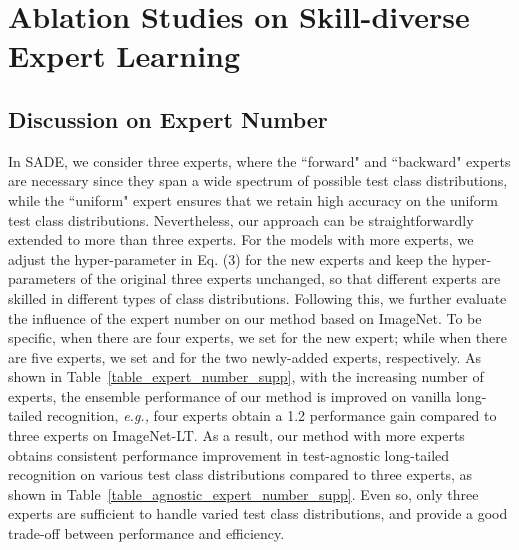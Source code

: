 \documentclass{article}
\def\eg{\emph{e.g.}} \def\Eg{\emph{E.g.}}
\def\eg{\emph{e.g., }}
\begin{document}
\clearpage 
\section{Ablation Studies on Skill-diverse Expert Learning}\label{App_E}
\subsection{Discussion on Expert Number}\label{App_E1}
In SADE, we consider three experts, where the ``forward" and ``backward" experts are necessary since they span a wide spectrum of possible test class distributions, while the ``uniform" expert ensures that we retain high accuracy on the uniform test class distributions. 
Nevertheless, our approach can be straightforwardly extended to more than three experts. 
For the models with  more  experts, we   adjust the  hyper-parameter  in Eq. (3) for the new experts and keep the hyper-parameters of the original three experts unchanged, so that different experts are skilled in different types of class distributions.
Following this, we further evaluate  the influence of the expert number on our method based on ImageNet. To be specific, when there are four experts, we set  for the new expert; while when there are five experts, we set  and  for the two newly-added experts, respectively.  As shown in Table~\ref{table_expert_number_supp}, with the increasing number of experts, the ensemble performance of our method  is improved on vanilla long-tailed recognition, \eg  four  experts   obtain  a 1.2 performance gain  compared to  three experts on ImageNet-LT. 
As a result, our method  with more experts obtains consistent performance improvement in test-agnostic long-tailed recognition on various test class distributions   compared to  three experts, as shown in Table~\ref{table_agnostic_expert_number_supp}.
Even so,  only three experts are sufficient to handle   varied test class distributions, and provide a good trade-off between  performance and efficiency. 
 
\end{document}
